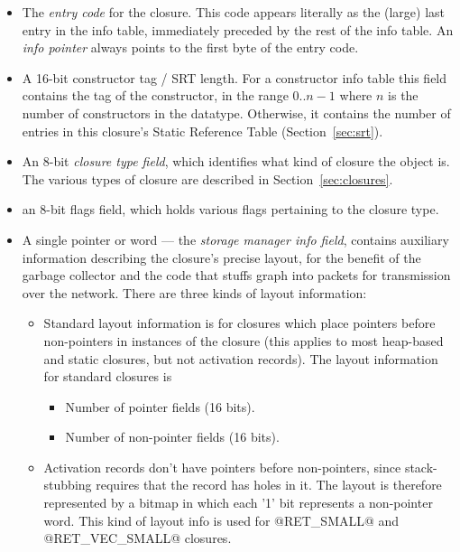 \documentclass[11pt]{article}
\newcommand{\secref}[1]{Section~\ref{sec:#1}}
\begin{document}
\begin{itemize}

\item The \emph{entry code} for the closure.  This code appears
literally as the (large) last entry in the info table, immediately
preceded by the rest of the info table.  An \emph{info pointer} always
points to the first byte of the entry code.

\item A 16-bit constructor tag / SRT length.  For a constructor info
table this field contains the tag of the constructor, in the range
$0..n-1$ where $n$ is the number of constructors in the datatype.
Otherwise, it contains the number of entries in this closure's Static
Reference Table (\secref{srt}).

\item An 8-bit {\em closure type field}, which identifies what kind of
closure the object is.  The various types of closure are described in
\secref{closures}.

\item an 8-bit flags field, which holds various flags pertaining to
the closure type.

\item A single pointer or word --- the {\em storage manager info
field}, contains auxiliary information describing the closure's
precise layout, for the benefit of the garbage collector and the code
that stuffs graph into packets for transmission over the network.
There are three kinds of layout information:

\begin{itemize}
\item Standard layout information is for closures which place pointers
before non-pointers in instances of the closure (this applies to most
heap-based and static closures, but not activation records).  The
layout information for standard closures is

	\begin{itemize}
	\item Number of pointer fields (16 bits).
	\item Number of non-pointer fields (16 bits).
	\end{itemize}

\item Activation records don't have pointers before non-pointers,
since stack-stubbing requires that the record has holes in it.  The
layout is therefore represented by a bitmap in which each '1' bit
represents a non-pointer word.  This kind of layout info is used for
@RET_SMALL@ and @RET_VEC_SMALL@ closures.


\end{itemize}
\end{itemize}
\end{document}
